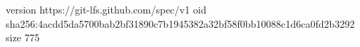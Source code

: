 version https://git-lfs.github.com/spec/v1
oid sha256:4acdd5da5700bab2bf31890c7b1945382a32bf58f0bb10088c1d6ca0fd2b3292
size 775
